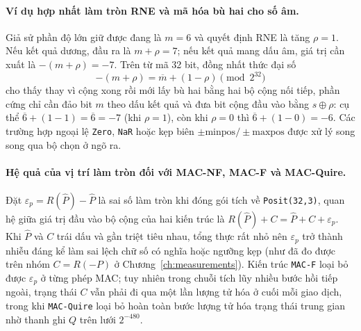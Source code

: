 \paragraph{Ví dụ hợp nhất làm tròn RNE và mã hóa bù hai cho số âm.}
Giả sử phần độ lớn giữ được đang là $m = 6$ và quyết định RNE là tăng $\rho = 1$.
Nếu kết quả dương, đầu ra là $m + \rho = 7$; nếu kết quả mang dấu âm, giá trị cần
xuất là $-(m+\rho) = -7$. Trên từ mã 32 bit, đồng nhất thức đại số
\[
-(m + \rho) = \overline{m} + (1 - \rho) \pmod{2^{32}}
\]
cho thấy thay vì cộng xong rồi mới lấy bù hai bằng hai bộ cộng nối tiếp, phần
cứng chỉ cần đảo bit $m$ theo dấu kết quả và đưa bit cộng đầu vào bằng
$s \oplus \rho$: cụ thể $\overline{6} + (1 - 1) = \overline{6} = -7$ (khi $\rho=1$),
còn khi $\rho=0$ thì $\overline{6} + (1 - 0) = -6$. Các trường hợp ngoại lệ
\texttt{Zero}, \texttt{NaR} hoặc kẹp biên $\pm\mathrm{minpos}/\pm\mathrm{maxpos}$
được xử lý song song qua bộ chọn ở ngõ ra.

\paragraph{Hệ quả của vị trí làm tròn đối với MAC-NF, MAC-F và MAC-Quire.}
Đặt $\varepsilon_p = R(\widehat P) - \widehat P$ là sai số làm tròn khi đóng gói
tích về \texttt{Posit(32,3)}, quan hệ giữa giá trị đầu vào bộ cộng của hai kiến
trúc là $R(\widehat P) + C = \widehat P + C + \varepsilon_p$. Khi $\widehat P$ và
$C$ trái dấu và gần triệt tiêu nhau, tổng thực rất nhỏ nên $\varepsilon_p$ trở thành
nhiễu đáng kể làm sai lệch chữ số có nghĩa hoặc ngưỡng kẹp (như đã đo được trên nhóm
$C=R(-P)$ ở Chương~\ref{ch:measurements}). Kiến trúc \texttt{MAC-F} loại bỏ được
$\varepsilon_p$ ở từng phép MAC; tuy nhiên trong chuỗi tích lũy nhiều bước hồi tiếp
ngoài, trạng thái $C$ vẫn phải đi qua một lần lượng tử hóa ở cuối mỗi giao dịch,
trong khi \texttt{MAC-Quire} loại bỏ hoàn toàn bước lượng tử hóa trạng thái trung
gian nhờ thanh ghi $Q$ trên lưới $2^{-480}$.
